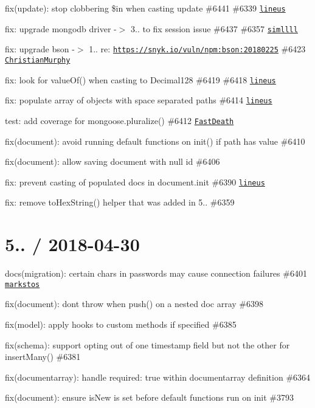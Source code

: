 \begin{DoxyItemize}
\item fix(update)\+: stop clobbering \$in when casting update \#6441 \#6339 \href{https://github.com/lineus}{\tt lineus}
\item fix\+: upgrade mongodb driver -\/$>$ 3.. to fix session issue \#6437 \#6357 \href{https://github.com/simllll}{\tt simllll}
\item fix\+: upgrade bson -\/$>$ 1.. re\+: \href{https://snyk.io/vuln/npm:bson:20180225}{\tt https\+://snyk.\+io/vuln/npm\+:bson\+:20180225} \#6423 \href{https://github.com/ChristianMurphy}{\tt Christian\+Murphy}
\item fix\+: look for {\ttfamily value\+Of()} when casting to Decimal128 \#6419 \#6418 \href{https://github.com/lineus}{\tt lineus}
\item fix\+: populate array of objects with space separated paths \#6414 \href{https://github.com/lineus}{\tt lineus}
\item test\+: add coverage for {\ttfamily mongoose.\+pluralize()} \#6412 \href{https://github.com/FastDeath}{\tt Fast\+Death}
\item fix(document)\+: avoid running default functions on init() if path has value \#6410
\item fix(document)\+: allow saving document with {\ttfamily null} id \#6406
\item fix\+: prevent casting of populated docs in document.\+init \#6390 \href{https://github.com/lineus}{\tt lineus}
\item fix\+: remove {\ttfamily to\+Hex\+String()} helper that was added in 5.. \#6359
\end{DoxyItemize}

\section*{5.. / 2018-\/04-\/30 }


\begin{DoxyItemize}
\item docs(migration)\+: certain chars in passwords may cause connection failures \#6401 \href{https://github.com/markstos}{\tt markstos}
\item fix(document)\+: don\textquotesingle{}t throw when {\ttfamily push()} on a nested doc array \#6398
\item fix(model)\+: apply hooks to custom methods if specified \#6385
\item fix(schema)\+: support opting out of one timestamp field but not the other for {\ttfamily insert\+Many()} \#6381
\item fix(documentarray)\+: handle {\ttfamily required\+: true} within documentarray definition \#6364
\item fix(document)\+: ensure {\ttfamily is\+New} is set before default functions run on init \#3793
\end{DoxyItemize}

